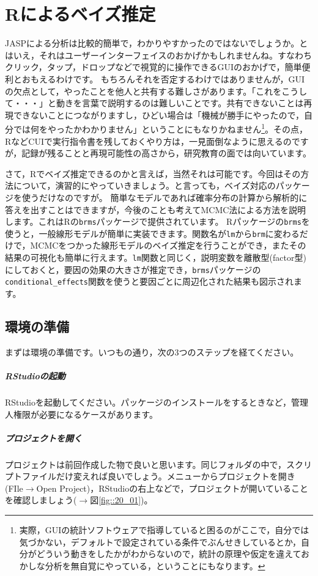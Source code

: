 \documentclass{ltjbook}
\begin{document}
\chapter{Rによるベイズ推定}
\label{chapter29}
JASPによる分析は比較的簡単で，わかりやすかったのではないでしょうか。とはいえ，それはユーザーインターフェイスのおかげかもしれませんね。すなわちクリック，タップ，ドロップなどで視覚的に操作できるGUIのおかげで，簡単便利とおもえるわけです。
もちろんそれを否定するわけではありませんが，GUIの欠点として，やったことを他人と共有する難しさがあります。「これをこうして・・・」と動きを言葉で説明するのは難しいことです。共有できないことは再現できないことにつながりますし，ひどい場合は「機械が勝手にやったので，自分では何をやったかわかりません」ということにもなりかねません\footnote{実際，GUIの統計ソフトウェアで指導していると困るのがここで，自分では気づかない，デフォルトで設定されている条件でぶんせきしているとか，自分がどういう動きをしたかがわからないので，統計の原理や仮定を違えておかしな分析を無自覚にやっている，ということにもなります。}。その点，RなどCUIで実行指令書を残しておくやり方は，一見面倒なように思えるのですが，記録が残ることと再現可能性の高さから，研究教育の面では向いています。

さて，Rでベイズ推定できるのかと言えば，当然それは可能です。今回はその方法について，演習的にやっていきましょう。と言っても，ベイズ対応のパッケージを使うだけなのですが。
簡単なモデルであれば確率分布の計算から解析的に答えを出すことはできますが，今後のことも考えてMCMC法による方法を説明します。これはRの\texttt{brms}パッケージ\citep{brmsCite1,brmsCite2}で提供されています。
Rパッケージの\texttt{brms}を使うと，一般線形モデルが簡単に実装できます。関数名が\texttt{lm}から\texttt{brm}に変わるだけで，MCMCをつかった線形モデルのベイズ推定を行うことができ，またその結果の可視化も簡単に行えます。\texttt{lm}関数と同じく，説明変数を離散型(factor型)にしておくと，要因の効果の大きさが推定でき，\texttt{brms}パッケージの\verb|conditional_effects|関数を使うと要因ごとに周辺化された結果も図示されます。
\section{環境の準備}
まずは環境の準備です。いつもの通り，次の3つのステップを経てください。
\paragraph{RStudioの起動}RStudioを起動してください。パッケージのインストールをするときなど，管理人権限が必要になるケースがあります。
\paragraph{プロジェクトを開く}プロジェクトは前回作成した物で良いと思います。同じフォルダの中で，スクリプトファイルだけ変えれば良いでしょう。メニューからプロジェクトを開き(FIle$\to$Open Project)，RStudioの右上などで，プロジェクトが開いていることを確認しましょう($\to$図\ref{fig::20_01})。
\end{document}
